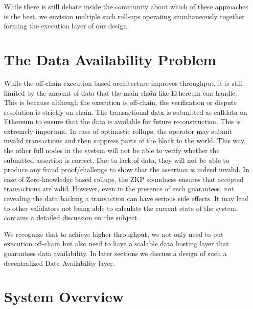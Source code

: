 \documentclass[sigconf, screen=true, nonacm]{acmart}
\begin{document}
    While there is still debate inside the community about which of these approaches is the best, we envision multiple such roll-ups operating simultaneously together forming the execution layer of our design. 

\section{The Data Availability Problem} 
    While the off-chain execution based architecture improves throughput, it is still limited by the amount of data that the main chain like Ethereum can handle. This is because although the execution is off-chain, the verification or dispute resolution is strictly on-chain. The transactional data is submitted as calldata on Ethereum to ensure that the data is available for future reconstruction. This is extremely important. In case of optimistic rollups, the operator may submit invalid transactions and then suppress parts of the block to the world. This way, the other full nodes in the system will not be able to verify whether the submitted assertion is correct. Due to lack of data, they will not be able to produce any fraud proof/challenge to show that the assertion is indeed invalid. In case of Zero-knowledge based rollups, the ZKP soundness ensures that accepted transactions are valid. However, even in the presence of such guarantees, not revealing the data backing a transaction can have serious side effects. It may lead to other validators not being able to calculate the current state of the system. \cite{EthWiki:2018} contains a detailed discussion on the subject. 

    We recognize that to achieve higher throughput, we not only need to put execution off-chain but also need to have a scalable data hosting layer that guarantees data availability. In later sections we discuss a design of such a decentralized Data Availability layer. 

\section{System Overview}
\end{document}
